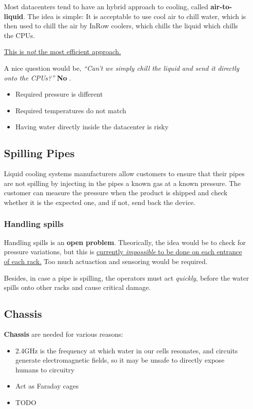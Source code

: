 \nl

Most datacenters tend to have an hybrid approach to cooling, called \textbf{air-to-liquid}.
The idea is simple:
It is acceptable to use cool air to chill water, which is then used to chill the air by InRow coolers, which chills the liquid which chills the CPUs.

\ul{This is \textit{not} the most efficient approach.}

A nice question would be, \textit{``Can't we simply chill the liquid and send it directly onto the CPUs?''} \textbf{No} \smiley.
\begin{itemize}
   \item Required pressure is different
   \item Required temperatures do not match
   \item Having water directly inside the datacenter is risky
\end{itemize}

\subsection{Spilling Pipes}
Liquid cooling systems manufacturers allow customers to ensure that their pipes are not spilling by injecting in the pipes a known gas at a known pressure.
The customer can measure the pressure when the product is shipped and check whether it is the expected one, and if not, send back the device.

\subsubsection*{Handling spills}
Handling spills is an \textbf{open problem}. 
Theorically, the idea would be to check for pressure variations, but this is \ul{currently \textit{impossible} to be done on each entrance of each rack.}
Too much actuaction and sensoring would be required.

Besides, in case a pipe is spilling, the operators must act \textit{quickly}, before the water spills onto other racks and cause critical damage. 

\subsection{Chassis}
\textbf{Chassis} are needed for various reasons:
\begin{itemize}
   \item 2.4GHz is the frequency at which water in our cells resonates, and circuits generate electromagnetic fields, so it may be unsafe to directly expose humans to circuitry
   \item Act as Faraday cages
   \item TODO
\end{itemize}
